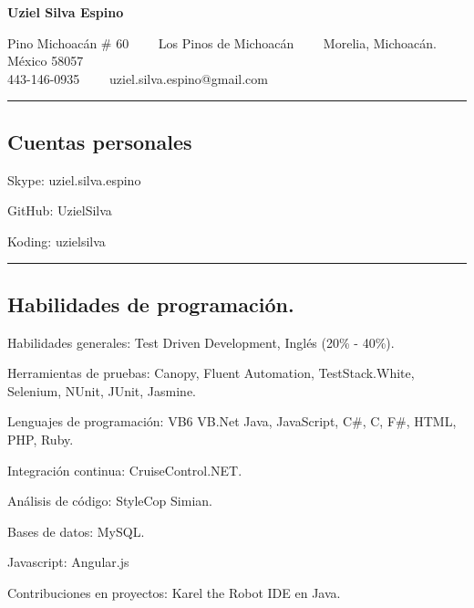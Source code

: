 \documentclass[10pt,letterpaper]{article}
\newenvironment{indentsection}[1]%
{\begin{list}{}%
	{\setlength{\leftmargin}{#1}}%
	\item[]%
}
{\end{list}}
\begin{document}
\begin{center}
{\LARGE \textbf{Uziel Silva Espino}}

Pino Michoacán \# 60\ \ \textbullet
\ \ Los Pinos de Michoacán\ \ \textbullet
\ \ Morelia, Michoacán. México 58057
\\
443-146-0935\ \ \textbullet
\ \ uziel.silva.espino@gmail.com
\end{center}

\hrule
\vspace{-0.4em}
\subsection*{Cuentas personales}

\begin{indentsection}{\parindent}
\begin{description*}
	\item[Skype:]
	uziel.silva.espino
	\item[GitHub:]
	UzielSilva
	\item[Koding:]
	uzielsilva
	
\end{description*}
\end{indentsection}

\hrule
\vspace{-0.4em}
\subsection*{Habilidades de programación.}

\begin{indentsection}{\parindent}
\begin{description*}
	\item[Habilidades generales:]
	Test Driven Development, Inglés (20\% - 40\%). 
	
	\item[Herramientas de pruebas:]
	Canopy,
	Fluent Automation,
	TestStack.White,
	Selenium,
	NUnit,
	JUnit,
	Jasmine.
	
	\item[Lenguajes de programación:]
	VB6
	VB.Net
	Java,
	JavaScript,
	C\#,
	C,
	F\#,
	HTML,
	PHP,
	Ruby. 
	
	\item[Integración continua:]
	CruiseControl.NET. 
	
	\item[Análisis de código:]
	StyleCop
	Simian. 
	
	\item[Bases de datos:]
	MySQL.
	
	\item[Javascript:]
	Angular.js
	
	\item[Contribuciones en proyectos:]
	Karel the Robot IDE en Java.
	
\end{description*}
\end{indentsection}
\end{document}
